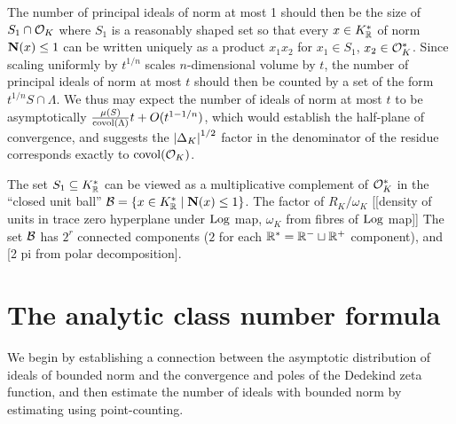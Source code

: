 \documentclass[11pt]{report}
\begin{document}
The number of principal ideals of norm at most 1 should then be the size of $S_1 \cap \mathcal{O}_K$ where $S_1$ is a reasonably shaped set so that every $x \in K_{\mathbb{R}}^*$ of norm $\operatorname{\mathbf{N}}(x) \leq 1$ can be written uniquely as a product $x_1x_2$ for $x_1 \in S_1$, $x_2 \in \mathcal{O}_K^*$. Since scaling uniformly by $t^{1/n}$ scales $n$-dimensional volume by $t$, the number of principal ideals of norm at most $t$ should then be counted by a set of the form $t^{1/n} S \cap \Lambda$. We thus may expect the number of ideals of norm at most $t$ to be asymptotically $\frac{\mu(S)}{\operatorname{covol}(\Lambda)}t + O(t^{1 - 1/n})$, which would establish the half-plane of convergence, and suggests the $\left| \Delta_K \right|^{1/2}$ factor in the denominator of the residue corresponds exactly to $\operatorname{covol}(\mathcal{O}_K)$.

The set $S_1 \subseteq K_{\mathbb{R}}^*$ can be viewed as a multiplicative complement of $\mathcal{O}_K^*$ in the ``closed unit ball'' $\mathcal{B} = \left\{  x \in K_{\mathbb{R}}^* \mid \operatorname{\mathbf{N}}(x) \leq 1  \right\}$. The factor of $R_K/\omega_K$ [[density of units in trace zero hyperplane under $\operatorname{Log}$ map, $\omega_K$ from fibres of $\operatorname{Log}$ map]] The set $\mathcal{B}$ has $2^r$ connected components ($2$ for each $\mathbb{R}^*  = \mathbb{R}^- \sqcup \mathbb{R}^+$ component), and [2 pi from polar decomposition].




\chapter{The analytic class number formula}
We begin by establishing a connection between the asymptotic distribution of ideals of bounded norm and the convergence and poles of the Dedekind zeta function, and then estimate the number of ideals with bounded norm by estimating using point-counting.
\end{document}
